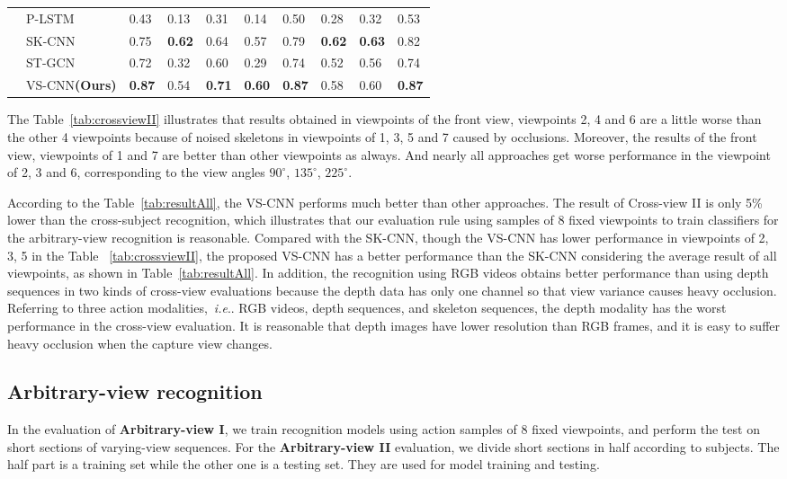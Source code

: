 \documentclass[journal]{IEEEtran}
\makeatletter
\DeclareRobustCommand\onedot{\futurelet\@let@token\@onedot}
\def\@onedot{\ifx\@let@token.\else.\null\fi\xspace}
\def\ie{\emph{i.e}\onedot} \def\Ie{\emph{I.e}\onedot}
\makeatother
\begin{document}
\begin{table*}[!t]
\begin{center}
\begin{tabular}{|p{1cm}|p{2.3cm}|p{1cm}|p{1cm}|p{1cm}|p{1cm}|p{1cm}|p{1cm}|p{1cm}|p{1cm}|}
 & P-LSTM~\cite{ShahroudyNTU2016} & 0.43 & 0.13 & 0.31 & 0.14 & 0.50  & 0.28  & 0.32  & 0.53   \\
 & SK-CNN~\cite{EnhancedSK2017} & 0.75 & \textbf{0.62} & 0.64 & 0.57 & 0.79  & \textbf{0.62}  & \textbf{0.63}  & 0.82  \\
 & ST-GCN~\cite{STGCN2018} & 0.72 & 0.32 & 0.60 & 0.29 & 0.74 & 0.52  & 0.56  & 0.74  \\
 & VS-CNN\textbf{(Ours)} & \textbf{0.87}  & 0.54  & \textbf{0.71}  & \textbf{0.60} & \textbf{0.87} & 0.58 & 0.60 & \textbf{0.87} \\
\hline
\end{tabular}
\end{center}
\end{table*}

The Table~\ref{tab:crossviewII} illustrates that results obtained in viewpoints of the front view, viewpoints 2, 4 and 6 are a little worse than the other 4 viewpoints because of noised skeletons in viewpoints of 1, 3, 5 and 7 caused by occlusions. Moreover, the results of the front view, viewpoints of 1 and 7 are better than other viewpoints as always. And nearly all approaches get worse performance in the viewpoint of 2, 3 and 6, corresponding to the view angles $90^\circ$, $135^\circ$, $225^\circ$.

According to the Table~\ref{tab:resultAll}, the VS-CNN performs much better than other approaches. The result of Cross-view II is only 5\% lower than the cross-subject recognition, which illustrates that our evaluation rule using samples of 8 fixed viewpoints to train classifiers for the arbitrary-view recognition is reasonable. Compared with the SK-CNN, though the VS-CNN has lower performance in viewpoints of 2, 3, 5 in the Table ~\ref{tab:crossviewII}, the proposed VS-CNN has a better performance than the SK-CNN considering the average result of all viewpoints, as shown in Table~\ref{tab:resultAll}. In addition, the recognition using RGB videos obtains better performance than using depth sequences in two kinds of cross-view evaluations because the depth data has only one channel so that view variance causes heavy occlusion. Referring to three action modalities,~\ie RGB videos, depth sequences, and skeleton sequences, the depth modality has the worst performance in the cross-view evaluation. It is reasonable that depth images have lower resolution than RGB frames, and it is easy to suffer heavy occlusion when the capture view changes.
\subsection{Arbitrary-view recognition}
In the evaluation of \textbf{Arbitrary-view I}, we train recognition models using action samples of 8 fixed viewpoints, and perform the test on short sections of varying-view sequences. For the \textbf{Arbitrary-view II} evaluation, we divide short sections in half according to subjects.  The half part is a training set while the other one is a testing set. They are used for model training and testing.
\end{document}
